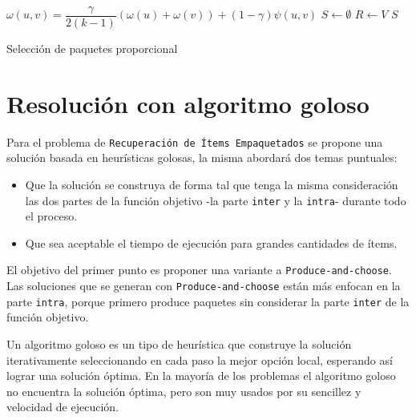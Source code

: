 \begin{center}
	\begin{algorithm}[H]
	\DontPrintSemicolon
	\SetAlgoLined
		$\omega(u,v) = \dfrac{\gamma}{2( k - 1)} (\omega(u) + \omega(v)) + (1 - \gamma)\psi(u,v)$\;
		$S \leftarrow \emptyset$\;
		$R \leftarrow V$\;
		\Return $S$\;
	\caption{Selección de paquetes proporcional}\label{alg:algSelProp}
	\end{algorithm}
\end{center}

\section{Resolución con algoritmo goloso}

Para el problema de \texttt{Recuperación de Ítems Empaquetados} se propone una solución basada en heurísticas golosas, la misma abordará dos temas puntuales:
\begin{itemize}
	\item Que la solución se construya de forma tal que tenga la misma consideración las dos partes de la función objetivo -la parte \texttt{inter} y la \texttt{intra}- durante todo el proceso.
	\item Que sea aceptable el tiempo de ejecución para grandes cantidades de ítems.
\end{itemize}

El objetivo del primer punto es proponer una variante a \texttt{Produce-and-choose}. Las soluciones que se generan con \texttt{Produce-and-choose} están más enfocan en la parte \texttt{intra}, porque primero produce paquetes sin considerar la parte \texttt{inter} de la función objetivo.

Un algoritmo goloso es un tipo de heurística que construye la solución iterativamente seleccionando en cada paso la mejor opción local, esperando así lograr una solución óptima. En la mayoría de los problemas el algoritmo goloso no encuentra la solución óptima, pero son muy usados por su sencillez y velocidad de ejecución.

